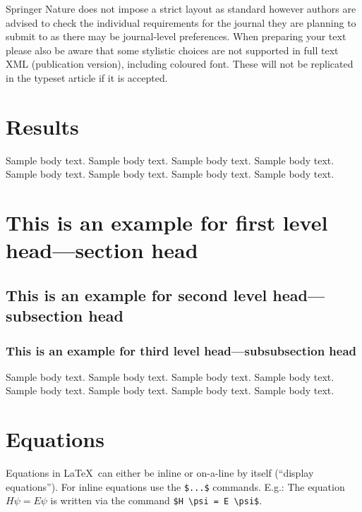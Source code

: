 \documentclass[sn-mathphys-num]{sn-jnl}%
\theoremstyle{thmstyleone}%
\theoremstyle{thmstyletwo}%
\theoremstyle{thmstylethree}%
\begin{document}

Springer Nature does not impose a strict layout as standard however authors are advised to check the individual requirements for the journal they are planning to submit to as there may be journal-level preferences. When preparing your text please also be aware that some stylistic choices are not supported in full text XML (publication version), including coloured font. These will not be replicated in the typeset article if it is accepted. 

\section{Results}\label{sec2}

Sample body text. Sample body text. Sample body text. Sample body text. Sample body text. Sample body text. Sample body text. Sample body text.

\section{This is an example for first level head---section head}\label{sec3}

\subsection{This is an example for second level head---subsection head}\label{subsec2}

\subsubsection{This is an example for third level head---subsubsection head}\label{subsubsec2}

Sample body text. Sample body text. Sample body text. Sample body text. Sample body text. Sample body text. Sample body text. Sample body text. 

\section{Equations}\label{sec4}

Equations in \LaTeX\ can either be inline or on-a-line by itself (``display equations''). For
inline equations use the \verb+$...$+ commands. E.g.: The equation
$H\psi = E \psi$ is written via the command \verb+$H \psi = E \psi$+.
\end{document}
